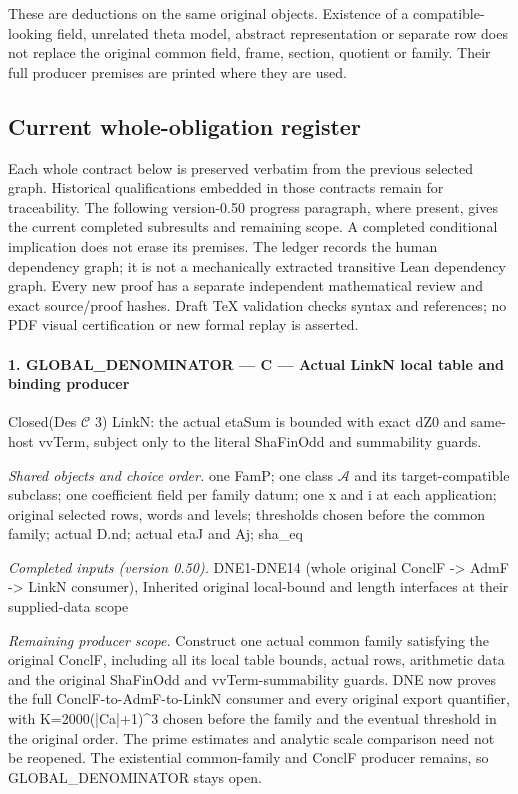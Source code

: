\documentclass[11pt,a4paper]{article}
\numberwithin{equation}{section}
\theoremstyle{remark}\newtheorem{remark}[theorem]{Remark}
\begin{document}
These are deductions on the same original objects. Existence of a
compatible-looking field, unrelated theta model, abstract representation
or separate row does not replace the original common field, frame,
section, quotient or family. Their full producer premises are printed
where they are used.

\subsection{Current whole-obligation register}

Each whole contract below is preserved verbatim from the previous
selected graph. Historical qualifications embedded in those contracts
remain for traceability. The following version-0.50 progress paragraph,
where present, gives the current completed subresults and remaining
scope. A completed conditional implication does not erase its premises.
The ledger records the human dependency graph; it is not a mechanically
extracted transitive Lean dependency graph. Every new proof has a
separate independent mathematical review and exact source/proof hashes.
Draft TeX validation checks syntax and references; no PDF visual
certification or new formal replay is asserted.

\paragraph{1. GLOBAL\_\allowbreak DENOMINATOR — C — Actual LinkN local table and binding producer}

Closed(Des $\mathcal C$ 3) LinkN: the actual etaSum is bounded with exact dZ0 and same-host vvTerm, subject only to the literal ShaFinOdd and summability guards.

\emph{Shared objects and choice order.} one FamP; one class $\mathcal A$ and its target-compatible subclass; one coefficient field per family datum; one x and i at each application; original selected rows, words and levels; thresholds chosen before the common family; actual D.nd; actual etaJ and Aj; sha\_\allowbreak eq

\emph{Completed inputs (version 0.50).} DNE1-DNE14 (whole original ConclF -> AdmF -> LinkN consumer), Inherited original local-bound and length interfaces at their supplied-data scope

\emph{Remaining producer scope.} Construct one actual common family satisfying the original ConclF, including all its local table bounds, actual rows, arithmetic data and the original ShaFinOdd and vvTerm-summability guards. DNE now proves the full ConclF-to-AdmF-to-LinkN consumer and every original export quantifier, with K=2000(|Ca|+1)\textasciicircum{}3 chosen before the family and the eventual threshold in the original order. The prime estimates and analytic scale comparison need not be reopened. The existential common-family and ConclF producer remains, so GLOBAL\_\allowbreak DENOMINATOR stays open.
\end{document}
